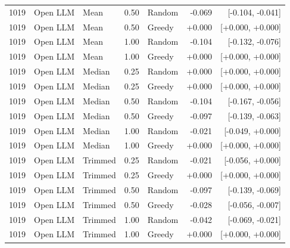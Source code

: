 \documentclass{article}
\begin{document}
\begin{longtable}{rlll lrr}
1019 & Open LLM & Mean & 0.50 & Random & -0.069 & [-0.104, -0.041] \\
1019 & Open LLM & Mean & 0.50 & Greedy & +0.000 & [+0.000, +0.000] \\
1019 & Open LLM & Mean & 1.00 & Random & -0.104 & [-0.132, -0.076] \\
1019 & Open LLM & Mean & 1.00 & Greedy & +0.000 & [+0.000, +0.000] \\
1019 & Open LLM & Median & 0.25 & Random & +0.000 & [+0.000, +0.000] \\
1019 & Open LLM & Median & 0.25 & Greedy & +0.000 & [+0.000, +0.000] \\
1019 & Open LLM & Median & 0.50 & Random & -0.104 & [-0.167, -0.056] \\
1019 & Open LLM & Median & 0.50 & Greedy & -0.097 & [-0.139, -0.063] \\
1019 & Open LLM & Median & 1.00 & Random & -0.021 & [-0.049, +0.000] \\
1019 & Open LLM & Median & 1.00 & Greedy & +0.000 & [+0.000, +0.000] \\
1019 & Open LLM & Trimmed & 0.25 & Random & -0.021 & [-0.056, +0.000] \\
1019 & Open LLM & Trimmed & 0.25 & Greedy & +0.000 & [+0.000, +0.000] \\
1019 & Open LLM & Trimmed & 0.50 & Random & -0.097 & [-0.139, -0.069] \\
1019 & Open LLM & Trimmed & 0.50 & Greedy & -0.028 & [-0.056, -0.007] \\
1019 & Open LLM & Trimmed & 1.00 & Random & -0.042 & [-0.069, -0.021] \\
1019 & Open LLM & Trimmed & 1.00 & Greedy & +0.000 & [+0.000, +0.000] \\
\bottomrule
\end{longtable}
\end{document}
